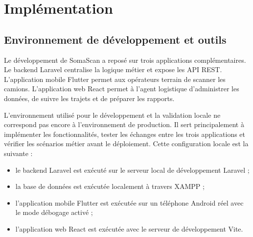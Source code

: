 \chapter{Implémentation}



\section{Environnement de développement et outils}

Le développement de SomaScan a reposé sur trois applications complémentaires. Le backend Laravel centralise la logique métier et expose les API REST. L'application mobile Flutter permet aux opérateurs terrain de scanner les camions. L'application web React permet à l'agent logistique d'administrer les données, de suivre les trajets et de préparer les rapports.

L'environnement utilisé pour le développement et la validation locale ne correspond pas encore à l'environnement de production. Il sert principalement à implémenter les fonctionnalités, tester les échanges entre les trois applications et vérifier les scénarios métier avant le déploiement. Cette configuration locale est la suivante :

\begin{itemize}
    \item le backend Laravel est exécuté sur le serveur local de développement Laravel ;
    \item la base de données est exécutée localement à travers XAMPP ;
    \item l'application mobile Flutter est exécutée sur un téléphone Android réel avec le mode débogage activé ;
    \item l'application web React est exécutée avec le serveur de développement Vite.
\end{itemize}

